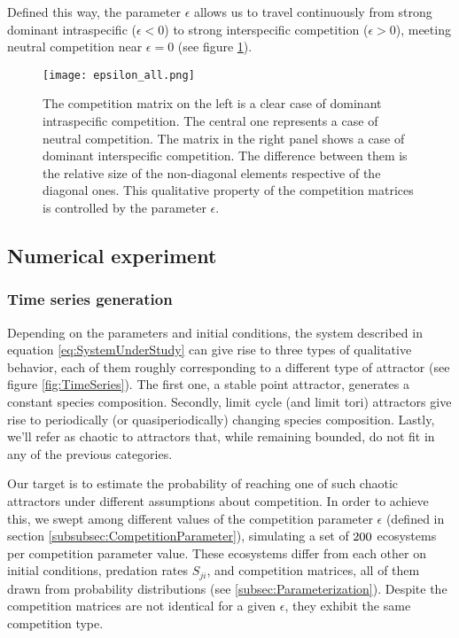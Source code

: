 Defined this way, the parameter $\epsilon$ allows us to travel continuously from strong dominant intraspecific ($ \epsilon < 0$) to strong interspecific competition ($ \epsilon > 0$), meeting neutral competition near $\epsilon = 0$ (see figure \ref{fig:CompetitionParameter}).

\begin{figure}[H]
	\begin{center}
		\texttt{[image: epsilon\_all.png]}
	\end{center}
	\caption{The competition matrix on the left is a clear case of dominant intraspecific competition. The central one represents a case of neutral competition. The matrix in the right panel shows a case of dominant interspecific competition. The difference between them is the relative size of the non-diagonal elements respective of the diagonal ones. This qualitative property of the competition matrices is controlled by the parameter $\epsilon$.}	
	\label{fig:CompetitionParameter}
\end{figure}

\subsection{Numerical experiment}
\label{subsec:NumericalExperiment}

\subsubsection{Time series generation}
\label{subsubsec:TimeSerieSGeneration}
Depending on the parameters and initial conditions, the system described in equation \ref{eq:SystemUnderStudy} can give rise to three types of qualitative behavior, each of them roughly corresponding to a different type of attractor (see figure \ref{fig:TimeSeries}). The first one, a stable point attractor, generates a constant species composition. Secondly, limit cycle (and limit tori) attractors give rise to periodically (or quasiperiodically) changing species composition. Lastly, we'll refer as chaotic to attractors that, while remaining bounded, do not fit in any of the previous categories.

Our target is to estimate the probability of reaching one of such chaotic attractors under different assumptions about competition. In order to achieve this, we swept among different values of the competition parameter $\epsilon$ (defined in section \ref{subsubsec:CompetitionParameter}), simulating a set of $200$ ecosystems per competition parameter value. These ecosystems differ from each other on initial conditions, predation rates $S_{ji}$, and competition matrices, all of them drawn from probability distributions (see \ref{subsec:Parameterization}). Despite the competition matrices are not identical for a given $\epsilon$, they exhibit the same competition type.

